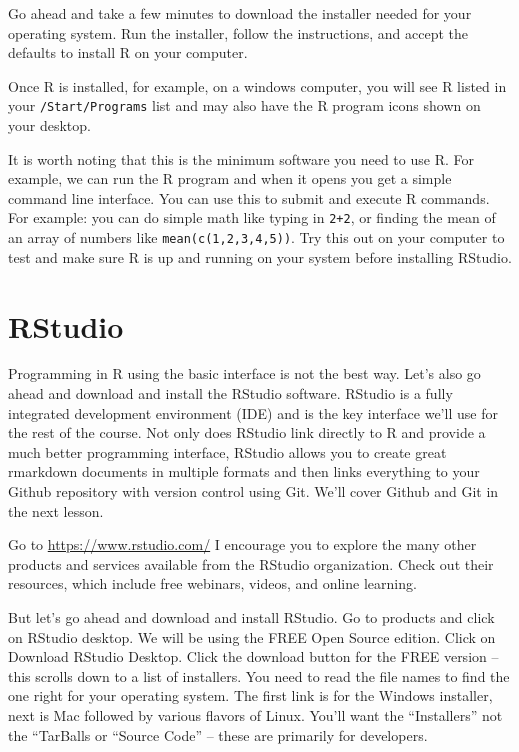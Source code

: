\documentclass[]{book}
\theoremstyle{definition}
\theoremstyle{definition}
\theoremstyle{definition}
\theoremstyle{remark}
\begin{document}
Go ahead and take a few minutes to download the installer needed for
your operating system. Run the installer, follow the instructions, and
accept the defaults to install R on your computer.

Once R is installed, for example, on a windows computer, you will see R
listed in your \texttt{/Start/Programs} list and may also have the R
program icons shown on your desktop.

It is worth noting that this is the minimum software you need to use R.
For example, we can run the R program and when it opens you get a simple
command line interface. You can use this to submit and execute R
commands. For example: you can do simple math like typing in
\texttt{2+2}, or finding the mean of an array of numbers like
\texttt{mean(c(1,2,3,4,5))}. Try this out on your computer to test and
make sure R is up and running on your system before installing RStudio.

\section{RStudio}\label{rstudio}

Programming in R using the basic interface is not the best way. Let's
also go ahead and download and install the RStudio software. RStudio is
a fully integrated development environment (IDE) and is the key
interface we'll use for the rest of the course. Not only does RStudio
link directly to R and provide a much better programming interface,
RStudio allows you to create great rmarkdown documents in multiple
formats and then links everything to your Github repository with version
control using Git. We'll cover Github and Git in the next lesson.

Go to \url{https://www.rstudio.com/} I encourage you to explore the many
other products and services available from the RStudio organization.
Check out their resources, which include free webinars, videos, and
online learning.

But let's go ahead and download and install RStudio. Go to products and
click on RStudio desktop. We will be using the FREE Open Source edition.
Click on Download RStudio Desktop. Click the download button for the
FREE version -- this scrolls down to a list of installers. You need to
read the file names to find the one right for your operating system. The
first link is for the Windows installer, next is Mac followed by various
flavors of Linux. You'll want the ``Installers'' not the ``TarBalls or
``Source Code'' -- these are primarily for developers.
\end{document}
